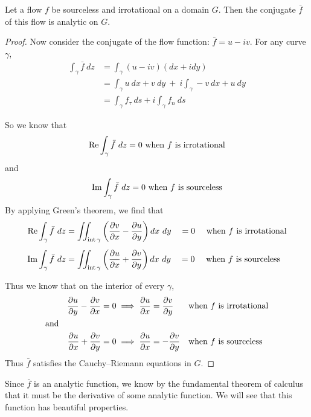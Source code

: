 \documentclass[letterpaper, twoside, 12 pt]{article}
\begin{document}
	\begin{theorem}
		Let a flow $f$ be sourceless and irrotational on a domain $G$.
		Then the conjugate $\bar f$ of this flow is analytic on $G$.
	\end{theorem}
	\begin{proof}
		Now consider the conjugate of the flow function: $\bar f = u - i v$.
		For any curve $\gamma$, 
		\begin{align*}
			\int_\gamma \bar f \ dz &= \int_\gamma (u - iv) (dx + i dy) \\
			&= \int_\gamma u\> dx + v\> dy \ + \ i \! \int_\gamma -v \> dx + u \> dy\\
			&= \int_\gamma f_\tau \ ds + i \int_\gamma f_n \ ds
		\end{align*}

		So we know that 
		\[
			\re \int_\gamma \bar f \ dz = 0 \text{ when $f$ is irrotational}
		\]
		and
		\[
			\operatorname*{Im} \int_\gamma \bar f \ dz = 0 \text{ when $f$ is sourceless}
		\]
		By applying Green's theorem, we find that 
		\begin{align*}
			\operatorname*{Re} \int_\gamma \bar f \ dz &= \iint_{\operatorname*{int} \gamma} \left( \frac{\partial v}{\partial x} - \frac{\partial u}{\partial y} \right) dx\ dy 
			\quad = 0 \quad \text{ when $f$ is irrotational}\\[1 ex]
			\operatorname*{Im} \int_\gamma \bar f \ dz &= \iint_{\operatorname*{int} \gamma} \left( \frac{\partial u}{\partial x} + \frac{\partial v}{\partial y} \right) dx\ dy 
			\quad = 0 \quad \text{ when $f$ is sourceless}
		\end{align*}

		Thus we know that on the interior of every $\gamma$, 
		\begin{align*}
			\frac{\partial u}{\partial y} - \frac{\partial v}{\partial x} &= 0 \implies \frac{\partial u}{\partial x} = \frac{\partial v}{\partial y} & &\text{when $f$ is irrotational} \\
			\text{and}\hspace{5 em}&\\
			\frac{\partial u}{\partial x} + \frac{\partial v}{\partial y} &= 0 \implies \frac{\partial u}{\partial x} = - \frac{\partial v}{\partial y} & &\text{when $f$ is sourceless} \\
		\end{align*}
		Thus $\bar f$ satisfies the Cauchy--Riemann equations in $G$.
	\end{proof}

	Since $\bar f$ is an analytic function, we know by the fundamental theorem of calculus that it must be the derivative of some analytic function.
	We will see that this function has beautiful properties.
\end{document}
